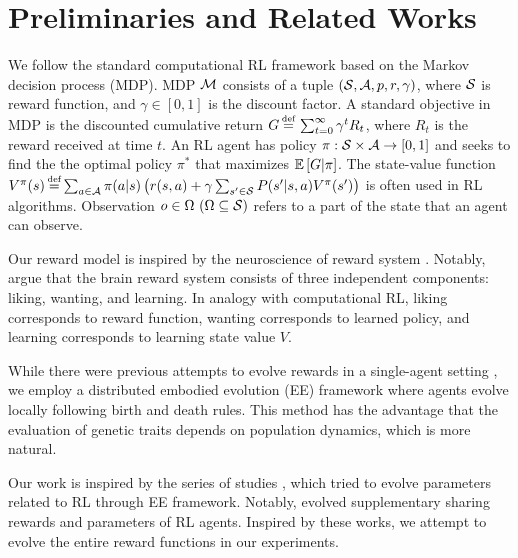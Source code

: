 \section{Preliminaries and Related Works}\label{sec:related}
We follow the standard computational RL framework \citep{suttonReinforcementLearningIntroduction2018} based on the Markov decision process (MDP). MDP $\mathcal{M}{}$ consists of a tuple $(\mathcal{S}{}, \mathcal{A}{}, p, r, \gamma)$, where $\mathcal{S}{}$ is reward function, and $\gamma \in [0, 1]$ is the discount factor. A standard objective in MDP is the discounted cumulative return $G \defequal{} \sum_{t=0}^{\infty}\gamma^t R_{t}$, where $R_t$ is the reward received at time $t$. An RL agent has policy $\pi: \mathcal{S} \times \mathcal{A} \rightarrow [0, 1]$ and seeks to find the the optimal policy $\pi^{*}$ that maximizes $\mathbb{E} \left[G|\pi\right]$. The state-value function $V^\pi(s) \defequal \sum_{a \in \A} \pi(a|s) \left( r(s, a) + \gamma \sum_{s' \in \X} P(s'|s, a) V^\pi(s') \right)$ is often used in RL algorithms. Observation $o \in \Omega~(\Omega \subseteq \mathcal{S})$ refers to a part of the state that an agent can observe.

Our reward model is inspired by the neuroscience of reward system \citep{schultzNeuronalRewardDecision2015, berridgePleasureSystemsBrain2015}. Notably, \citet{berridgeDissectingComponentsReward2009} argue that the brain reward system consists of three independent components: liking, wanting, and learning. In analogy with computational RL, liking corresponds to reward function, wanting corresponds to learned policy, and learning corresponds to learning state value $V$.

While there were previous attempts to evolve rewards in a single-agent setting \citep{singhWhereRewardsCome2009,niekumEvolutionRewardFunctions2011,zhengWhatCanLearned2020},
we employ a distributed embodied evolution (EE) framework \citep{watsonEmbodiedEvolutionDistributing2002,bredecheEmbodiedEvolutionCollective2018}
where agents evolve locally following birth and death rules. This method has the advantage that the evaluation of genetic traits depends on population dynamics, which is more natural.

Our work is inspired by the series of studies \citep{elfwingBiologicallyInspiredEmbodied2005,elfwingDarwinianEmbodiedEvolution2011,elfwingEmergencePolymorphicMating2014}, which tried to evolve parameters related to RL through EE framework. Notably, \citet{elfwingDarwinianEmbodiedEvolution2011} evolved supplementary sharing rewards and parameters of RL agents.
Inspired by these works, we attempt to evolve the entire reward functions in our experiments.

